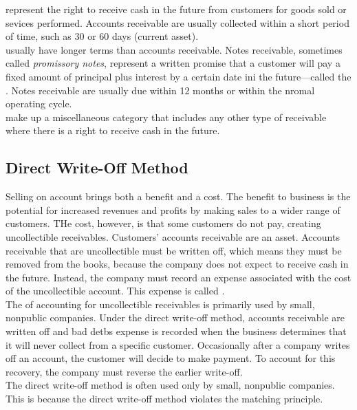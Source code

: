 \documentclass{article}
\begin{document}
 represent the right to receive cash in the future from customers for goods sold or sevices performed. Accounts receivable are usually collected within a short period of time, such as 30 or 60 days (current asset). \\ 

 usually have longer terms than accounts receivable. Notes receivable, sometimes called \emph{promissory notes}, represent a written promise that a customer will pay a fixed amount of principal plus interest by a certain date ini the future---called the . Notes receivable are usually due within 12 months or within the nromal operating cycle. \\ 

 make up a miscellaneous category that includes any other type of receivable where there is a right to receive cash in the future. \\ 

\subsection{Direct Write-Off Method}

Selling on account brings both a benefit and a cost. The benefit to business is the potential for increased revenues and profits by making sales to a wider range of customers. THe cost, however, is that some customers do not pay, creating uncollectible receivables. Customers' accounts receivable are an asset. Accounts receivable that are uncollectible must be written off, which means they must be removed from the books, because the company does not expect to receive cash in the future. Instead, the company must record an expense associated with the cost of the uncollectible account. This expense is called . \\ 

The  of accounting for uncollectible receivables is primarily used by small, nonpublic companies. Under the direct write-off method, accounts receivable are written off and bad detbs expense is recorded when the business determines that it will never collect from a specific customer. Occasionally after a company writes off an account, the customer will decide to make payment. To account for this recovery, the company must reverse the earlier write-off. \\ 

The direct write-off method is often used only by small, nonpublic companies. This is because the direct write-off method violates the matching principle. 
\end{document}
